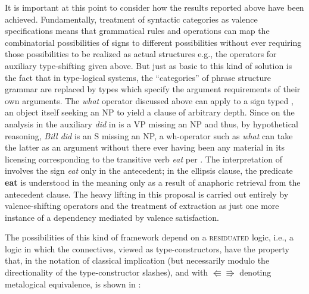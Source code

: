 \documentclass[output=paper,colorlinks,citecolor=brown]{langscibook}
\begin{document}
It is important at this point to consider how the results reported
above have been achieved. Fundamentally, treatment of syntactic
categories as valence specifications means that grammatical
rules and operations can map the combinatorial possibilities of signs
to different possibilities without ever requiring those possibilities
to be realized as actual structures e.g., the operators for auxiliary
type-shifting given above. But just as basic to this kind of solution
is the fact that in type-logical systems, the ``categories'' of phrase
structure grammar are replaced by types which specify the argument
requirements of their own arguments. The \textit{what} operator discussed
above can apply to a sign typed , an object itself seeking an NP
to yield a clause of arbitrary depth. Since on the analysis in
 the auxiliary \textit{did} in  is a VP
missing an NP and thus, by hypothetical reasoning, \textit{Bill did} is an S
missing an NP, a wh-operator such as \textit{what} can take the latter as
an argument without there ever having been any material in its
licensing corresponding to the transitive verb \textit{eat} per
. The interpretation of  involves
the sign \textit{eat} only in the antecedent; in the ellipsis clause, the
predicate \textbf{eat} is understood in the meaning only as a result of
anaphoric retrieval from the antecedent clause. The heavy lifting in
this proposal is carried out entirely by valence-shifting operators
and the treatment of extraction as just one more instance of a
dependency mediated by valence satisfaction.

The possibilities of this kind of framework depend on a \textsc{residuated}
logic, i.e., a logic in which the connectives, viewed as
type-constructors, have the property that, in the notation of
classical implication (but necessarily modulo the directionality of the
type-constructor slashes), and with $\Lleftarrow\!\Rrightarrow$
denoting metalogical equivalence, is shown in :
\end{document}
